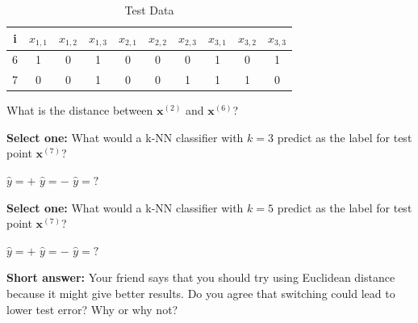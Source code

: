 \documentclass[11pt,addpoints,answers]{exam}
\newcommand{\xv}{\mathbf{x}}
\begin{document}
\begin{questions}
\begin{parts}
\begin{EnvFullwidth}
    
    \begin{table}[H]
        \begin{center}
        \begin{tabular}{cccccccccc}
            \toprule
             i & $x_{1,1}$ & $x_{1,2}$ & $x_{1,3}$ & $x_{2,1}$ & $x_{2,2}$ & $x_{2,3}$ & $x_{3,1}$ & $x_{3,2}$ & $x_{3,3}$  \\
             \midrule
             6 & 1 & 0 & 1 & 0 & 0 & 0 & 1 & 0 & 1 \\
             7 & 0 & 0 & 1 & 0 & 0 & 1 & 1 & 1 & 0 \\
             \bottomrule
        \end{tabular}
        \end{center}
     \caption{Test Data}
     \label{tab:knnimages}
    \end{table}
    
    \end{EnvFullwidth}
    
    \clearpage
    
    \begin{subparts}
    
    \subpart[1] What is the distance between $\xv^{(2)}$ and $\xv^{(6)}$? \\
        \begin{your_solution}[title=Your answer:,height=2cm,width=5cm]
        \end{your_solution}
        
    \subpart[1] \textbf{Select one:} What would a k-NN classifier with $k=3$ predict as the label for test point $\xv^{(7)}$?
        \begin{checkboxes}
         \choice $\hat{y}=+$
         \choice $\hat{y}=-$
         \choice $\hat{y}=?$
        \end{checkboxes}
        
    \subpart[1] \textbf{Select one:} What would a k-NN classifier with $k=5$ predict as the label for test point $\xv^{(7)}$?
        \begin{checkboxes}
         \choice $\hat{y}=+$
         \choice $\hat{y}=-$
         \choice $\hat{y}=?$
        \end{checkboxes}
    
    \subpart[2] \textbf{Short answer:} Your friend says that you should try using Euclidean distance because it might give better results. Do you agree that switching could lead to lower test error? Why or why not? \\
        \begin{your_solution}[title=Your answer:, height=5cm]
        \end{your_solution}
        

\end{subparts}
\end{parts}
\end{questions}
\end{document}
